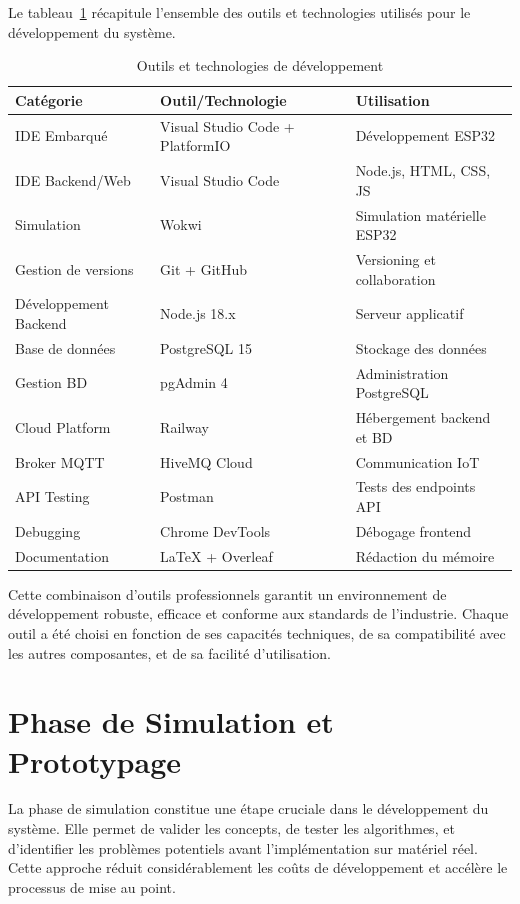 Le tableau~\ref{tab:dev_tools} récapitule l'ensemble des outils et technologies utilisés pour le développement du système.

\begin{table}[H]
\centering
\caption{Outils et technologies de développement}
\label{tab:dev_tools}
\begin{tabular}{@{}lll@{}}
\toprule
\textbf{Catégorie} & \textbf{Outil/Technologie} & \textbf{Utilisation} \\
\midrule
IDE Embarqué & Visual Studio Code + PlatformIO & Développement ESP32 \\
IDE Backend/Web & Visual Studio Code & Node.js, HTML, CSS, JS \\
Simulation & Wokwi & Simulation matérielle ESP32 \\
Gestion de versions & Git + GitHub & Versioning et collaboration \\
Développement Backend & Node.js 18.x & Serveur applicatif \\
Base de données & PostgreSQL 15 & Stockage des données \\
Gestion BD & pgAdmin 4 & Administration PostgreSQL \\
Cloud Platform & Railway & Hébergement backend et BD \\
Broker MQTT & HiveMQ Cloud & Communication IoT \\
API Testing & Postman & Tests des endpoints API \\
Debugging & Chrome DevTools & Débogage frontend \\
Documentation & LaTeX + Overleaf & Rédaction du mémoire \\
\bottomrule
\end{tabular}
\end{table}

Cette combinaison d'outils professionnels garantit un environnement de développement robuste, efficace et conforme aux standards de l'industrie. Chaque outil a été choisi en fonction de ses capacités techniques, de sa compatibilité avec les autres composantes, et de sa facilité d'utilisation.

\section{Phase de Simulation et Prototypage}
\label{sec:impl_simulation}

La phase de simulation constitue une étape cruciale dans le développement du système. Elle permet de valider les concepts, de tester les algorithmes, et d'identifier les problèmes potentiels avant l'implémentation sur matériel réel. Cette approche réduit considérablement les coûts de développement et accélère le processus de mise au point.

